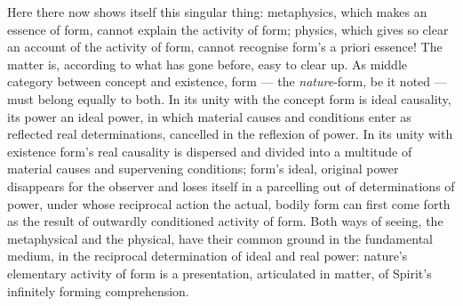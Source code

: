 \documentclass[12pt,a4paper]{book}
\begin{document}
Here there now shows itself this singular thing: metaphysics, which makes an essence of form, cannot explain the activity
of form; physics, which gives so clear an account of the activity of form, cannot recognise form's a priori essence! The
matter is, according to what has gone before, easy to clear up. As middle category between concept and existence, form
--- the \emph{nature}-form, be it noted --- must belong equally to both. In its unity with the concept form is ideal
causality, its power
an ideal power, in which material causes and conditions enter as reflected real determinations, cancelled in the reflexion
of power. In its unity with existence form's real causality is dispersed and divided into a multitude of material causes
and supervening conditions; form's ideal, original power disappears for the observer and loses itself in a parcelling out
of determinations of power, under whose reciprocal action the actual, bodily form can first come forth as the result of
outwardly conditioned activity of form. Both ways of seeing, the metaphysical and the physical, have their common ground
in the fundamental medium, in the reciprocal determination of ideal and real power: nature's elementary activity of form
is a presentation, articulated in matter, of Spirit's infinitely forming comprehension.
\end{document}
